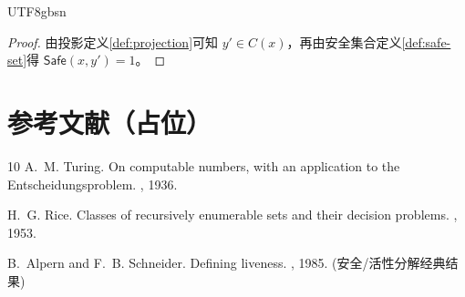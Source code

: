 \documentclass[letterpaper,twocolumn,10pt]{article}
\newcommand{\Safe}{\mathsf{Safe}}
\begin{document}
\begin{CJK}{UTF8}{gbsn}
\begin{proof}
由投影定义\ref{def:projection}可知 $y'\in C(x)$，再由安全集合定义\ref{def:safe-set}得 $\Safe(x,y')=1$。
\end{proof}

\section*{参考文献（占位）}
\begin{thebibliography}{10}\setlength{\itemsep}{0pt}
A.~M. Turing.
\newblock On computable numbers, with an application to the {E}ntscheidungsproblem.
, 1936.

H.~G. Rice.
\newblock Classes of recursively enumerable sets and their decision problems.
, 1953.

B.~Alpern and F.~B. Schneider.
\newblock Defining liveness.
, 1985. (安全/活性分解经典结果)
\end{thebibliography}

\end{CJK}
\end{document}
